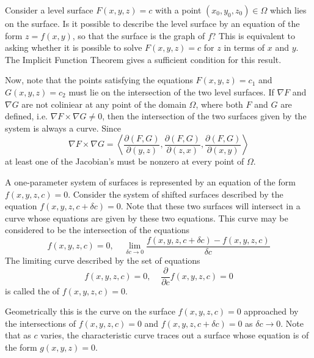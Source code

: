     Consider a level surface $F(x,y,z) = c$ with a point $(x_0,y_0,z_0) \in \Omega$ which lies on the surface. Is it possible to describe the level surface by an equation of the form $z = f(x,y)$, so that the surface is the graph of $f$? This is equivalent to asking whether it is possible to solve $F(x,y,z) = c$ for $z$ in terms of $x$ and $y$. The Implicit Function Theorem gives a sufficient condition for this result.

    Now, note that the points satisfying the equations $F(x,y,z) = c_1$ and $G(x,y,z) = c_2$ must lie on the intersection of the two level surfaces. If $\nabla F$ and $\nabla G$ are not coliniear at any point of the domain $\Omega$, where both $F$ and $G$ are defined, i.e. $\nabla F\times \nabla G \neq 0$, then the intersection of the two surfaces given by the system is always a curve. Since \begin{equation*}
        \nabla F\times \nabla G = \left\langle \frac{\partial(F,G)}{\partial(y,z)}, \frac{\partial(F,G)}{\partial(z,x)},\frac{\partial(F,G)}{\partial(x,y)}\right\rangle
    \end{equation*}
    at least one of the Jacobian's must be nonzero at every point of $\Omega$.

    \begin{definition}
        A one-parameter system of surfaces is represented by an equation of the form $f(x,y,z,c) = 0$. Consider the system of shifted surfaces described by the equation $f(x,y,z,c+\delta c) = 0$. Note that these two surfaces will intersect in a curve whose equations are given by these two equations. This curve may be considered to be the intersection of the equations \begin{equation*}
            f(x,y,z,c) = 0,\;\;\;\;\lim\limits_{\delta c\rightarrow 0}\frac{f(x,y,z,c+\delta c)-f(x,y,z,c)}{\delta c}
        \end{equation*}
        The limiting curve described by the set of equations \begin{equation*}
            f(x,y,z,c) = 0,\;\;\;\;\frac{\partial}{\partial c}f(x,y,z,c) = 0
        \end{equation*}
        is called the  of $f(x,y,z,c) = 0$.
    \end{definition}

    Geometrically this is the curve on the surface $f(x,y,z,c) = 0$ approached by the intersections of $f(x,y,z,c) = 0$ and $f(x,y,z,c+\delta c) = 0$ as $\delta c \rightarrow 0$. Note that as $c$ varies, the characteristic curve traces out a surface whose equation is of the form $g(x,y,z) = 0$.


